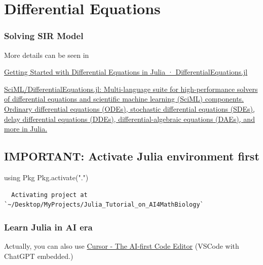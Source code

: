 \documentclass[
  letterpaper,
  DIV=11,
  numbers=noendperiod]{scrreport}
\newenvironment{Shaded}{\begin{snugshade}}{\end{snugshade}}
\newcommand{\BuiltInTok}[1]{\textcolor[rgb]{0.00,0.23,0.31}{#1}}
\newcommand{\FunctionTok}[1]{\textcolor[rgb]{0.28,0.35,0.67}{#1}}
\newcommand{\ImportTok}[1]{\textcolor[rgb]{0.00,0.46,0.62}{#1}}
\newcommand{\NormalTok}[1]{\textcolor[rgb]{0.00,0.23,0.31}{#1}}
\newcommand{\StringTok}[1]{\textcolor[rgb]{0.13,0.47,0.30}{#1}}
\begin{document}

\chapter{Differential Equations}\label{differential-equations}

\subsection{Solving SIR Model}\label{solving-sir-model}

More details can be seen in

\href{https://docs.sciml.ai/DiffEqDocs/stable/getting_started/}{Getting
Started with Differential Equations in Julia · DifferentialEquations.jl}

\href{https://github.com/SciML/DifferentialEquations.jl}{SciML/DifferentialEquations.jl:
Multi-language suite for high-performance solvers of differential
equations and scientific machine learning (SciML) components. Ordinary
differential equations (ODEs), stochastic differential equations (SDEs),
delay differential equations (DDEs), differential-algebraic equations
(DAEs), and more in Julia.}

\section{IMPORTANT: Activate Julia environment
first}\label{important-activate-julia-environment-first-1}

\begin{Shaded}
\begin{Highlighting}[]
\ImportTok{using} \BuiltInTok{Pkg}
\BuiltInTok{Pkg}\NormalTok{.}\FunctionTok{activate}\NormalTok{(}\StringTok{"."}\NormalTok{)}
\end{Highlighting}
\end{Shaded}

\begin{verbatim}
  Activating project at `~/Desktop/MyProjects/Julia_Tutorial_on_AI4MathBiology`
\end{verbatim}

\subsection{Learn Julia in AI era}\label{learn-julia-in-ai-era}

Actually, you can also use \href{https://cursor.sh/}{Cursor - The
AI-first Code Editor} (VSCode with ChatGPT embedded.)
\end{document}
